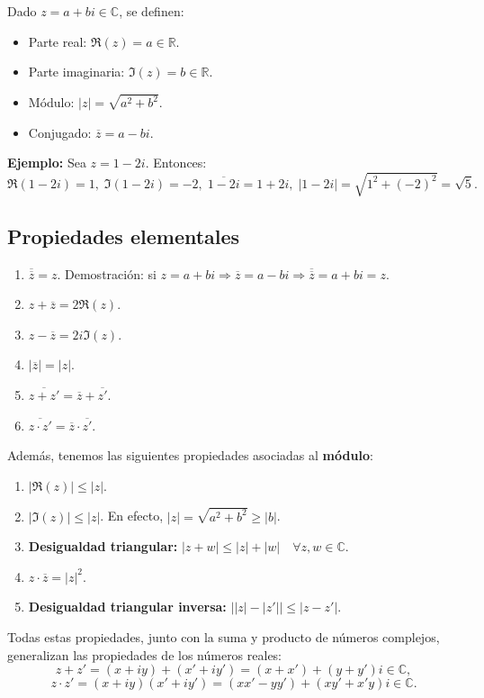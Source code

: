 \documentclass[a4paper,12pt]{article}
\begin{document}
Dado $z = a+bi \in \mathbb{C}$, se definen:
\begin{itemize}
    \item Parte real: $\Re(z) = a \in \mathbb{R}$.
    \item Parte imaginaria: $\Im(z) = b \in \mathbb{R}$.
    \item Módulo: $|z| = \sqrt{a^2+b^2}$.
    \item Conjugado: $\overline{z} = a - bi$.
\end{itemize}

\noindent\textbf{Ejemplo:} Sea \( z = 1 - 2i \). Entonces:
\[
\Re(1-2i) = 1, \; \Im(1-2i) = -2, \; \overline{1-2i} = 1 + 2i, \; |1-2i| = \sqrt{1^2 + (-2)^2} = \sqrt{5}.
\]

\subsection{Propiedades elementales}

\begin{enumerate}
    \item $\overline{\overline{z}} = z$. \; Demostración: si $z = a + bi \Rightarrow \overline{z} = a - bi \Rightarrow \overline{\overline{z}} = a + bi = z$.
    \item $z + \overline{z} = 2 \Re(z)$.
    \item $z - \overline{z} = 2i \Im(z)$.
    \item $|\overline{z}| = |z|$.
    \item $\overline{z + z'} = \overline{z} + \overline{z'}$.
    \item $\overline{z \cdot z'} = \overline{z} \cdot \overline{z'}$.
\end{enumerate}

Además, tenemos las siguientes propiedades asociadas al \textbf{módulo}:
\begin{enumerate}
    \item $|\Re(z)| \leq |z|$.
    \item $|\Im(z)| \leq |z|$. \; En efecto, $|z| = \sqrt{a^2 + b^2} \geq |b|$.
    \item \textbf{Desigualdad triangular:} \; $|z+w| \leq |z| + |w| \quad \forall z,w \in \mathbb{C}$.
    \item $z \cdot \overline{z} = |z|^2$.
    \item \textbf{Desigualdad triangular inversa:} \; $\big||z| - |z'|\big| \leq |z-z'|$.
\end{enumerate}

Todas estas propiedades, junto con la suma y producto de números complejos, generalizan las propiedades de los números reales:
\[
z+z' = (x+iy) + (x' + i y') = (x+x') + (y+y')i \in \mathbb{C},
\]
\[
z \cdot z' = (x+iy)(x'+iy') = (xx'-yy') + (xy'+x'y)i \in \mathbb{C}.
\]
\end{document}
